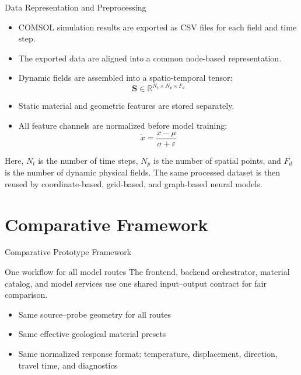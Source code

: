 \documentclass[aspectratio=169,10pt]{beamer}
\begin{document}
\begin{frame}{Data Representation and Preprocessing}
  \begin{itemize}
    \item COMSOL simulation results are exported as CSV files for each field
          and time step.
    \item The exported data are aligned into a common node-based representation.
    \item Dynamic fields are assembled into a spatio-temporal tensor:
          \[
            \mathbf{S}\in\mathbb{R}^{N_t \times N_p \times F_d}
          \]
    \item Static material and geometric features are stored separately.
    \item All feature channels are normalized before model training:
          \[
            \widetilde{x}=\frac{x-\mu}{\sigma+\varepsilon}
          \]
  \end{itemize}

  \scriptsize
  Here, $N_t$ is the number of time steps, $N_p$ is the number of spatial
  points, and $F_d$ is the number of dynamic physical fields. The same processed
  dataset is then reused by coordinate-based, grid-based, and graph-based
  neural models.
\end{frame}

\section{Comparative Framework}

\begin{frame}{Comparative Prototype Framework}
  \begin{block}{One workflow for all model routes}
    The frontend, backend orchestrator, material catalog, and model
    services use one shared input--output contract for fair comparison.
  \end{block}
  \vskip 6pt
  \begin{itemize}
    \item Same source--probe geometry for all routes
    \item Same effective geological material presets
    \item Same normalized response format: temperature, displacement,
          direction, travel time, and diagnostics
  \end{itemize}
\end{frame}
\end{document}

